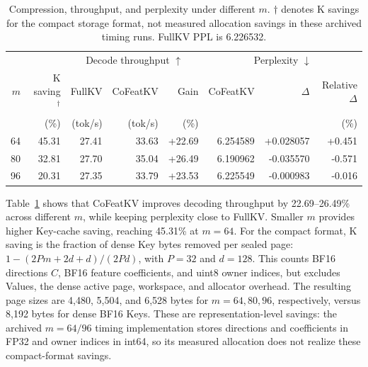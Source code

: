 \documentclass{article} %
\begin{document}
\begin{table}[H]
\centering
\caption{Compression, throughput, and perplexity under different $m$.
$\dagger$ denotes K savings for the compact storage format,
not measured allocation savings in these archived timing runs. FullKV PPL is 6.226532.}
\label{tab:ablation-budget-runtime}
\small
\setlength{\tabcolsep}{4pt}
\begin{tabular}{@{}rrrrrrrr@{}}
\toprule
 & & \multicolumn{3}{c}{Decode throughput $\uparrow$}
 & \multicolumn{3}{c}{Perplexity $\downarrow$} \\
\cmidrule(lr){3-5}\cmidrule(l){6-8}
$m$ & K saving$^\dagger$ & FullKV & CoFeatKV & Gain & CoFeatKV & $\Delta$ & Relative $\Delta$ \\
 & (\%) & (tok/s) & (tok/s) & (\%) & & & (\%) \\
\midrule
64 & 45.31 & 27.41 & 33.63 & +22.69 & 6.254589 & +0.028057 & +0.451 \\
80 & 32.81 & 27.70 & 35.04 & +26.49 & 6.190962 & -0.035570 & -0.571 \\
96 & 20.31 & 27.35 & 33.79 & +23.53 & 6.225549 & -0.000983 & -0.016 \\
\bottomrule
\end{tabular}
\end{table}

Table~\ref{tab:ablation-budget-runtime} shows that CoFeatKV improves decoding throughput
by 22.69--26.49\% across different $m$, while keeping perplexity close to
FullKV. Smaller $m$ provides higher Key-cache saving, reaching 45.31\% at
$m=64$.
For the compact format, K saving is the fraction of dense Key bytes removed
per sealed page: $1-(2Pm+2d+d)/(2Pd)$, with $P=32$ and $d=128$.
This counts BF16 directions $C$, BF16 feature coefficients, and uint8 owner
indices, but excludes Values, the dense active page, workspace, and allocator
overhead. The resulting page sizes are 4,480, 5,504, and 6,528 bytes for
$m=64,80,96$, respectively, versus 8,192 bytes for dense BF16 Keys.
These are representation-level savings: the archived $m=64/96$ timing
implementation stores directions and coefficients in FP32 and owner indices
in int64, so its measured allocation does not realize these compact-format
savings.
\end{document}
